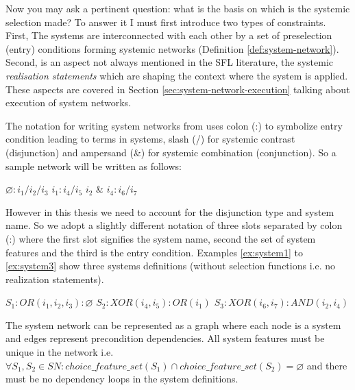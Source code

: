 Now you may ask a pertinent question: what is the basis on which is the systemic selection made? To answer it I must first introduce two types of constraints. 
First, The systems are interconnected with each other by a set of preselection (entry) conditions forming systemic networks (Definition \ref{def:system-network}). Second, is an aspect not always mentioned in the SFL literature, the systemic \textit{realisation statements} which are shaping the context where the system is applied. These aspects are covered in Section \ref{sec:system-network-execution} talking about execution of system networks.  

The notation for writing system networks from \citep{Halliday2013} uses colon (:) to symbolize entry condition leading to terms in systems, slash (/) for systemic contrast (disjunction) and ampersand (\&) for systemic combination (conjunction). So a sample network will be written as follows:

\begin{exe}
	\ex\label{ex:system10} $\varnothing: i_1 / i_2/i_3 $
	\ex\label{ex:system11} $i_1: i_4 / i_5 $
	\ex\label{ex:system12} $i_2$ \& $i_4: i_6 / i_7 $
\end{exe}

However in this thesis we need to account for the disjunction type and system name. So we adopt a slightly different notation of three slots separated by colon (:) where the first slot signifies the system name, second the set of system features and the third is the entry condition. Examples \ref{ex:system1} to \ref{ex:system3} show three systems definitions (without selection functions i.e. no realization statements). 
\begin{exe}
	\ex\label{ex:system1} $S_1:OR(i_1,i_2,i_3):\varnothing$
	\ex\label{ex:system2} $S_2:XOR(i_4,i_5):OR(i_1)$
	\ex\label{ex:system3} $S_3:XOR(i_6,i_7):AND(i_2,i_4)$
\end{exe}

The system network can be represented as a graph where each node is a system and edges represent precondition dependencies. All system features must be unique in the network i.e. ${\forall S_1, S_2 \in SN: choice\_feature\_set(S_1) \cap choice\_feature\_set(S_2) = \varnothing}$ and there must be no dependency loops in the system definitions.

